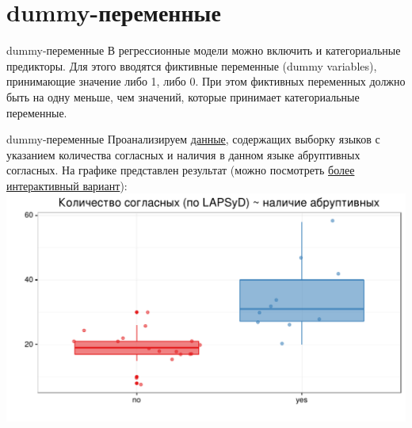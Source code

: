 \section{dummy-переменные}
\begin{frame}{dummy-переменные}
В регрессионные модели можно включить и категориальные предикторы. Для этого вводятся фиктивные переменные (dummy variables), принимающие значение либо 1, либо 0. При этом фиктивных переменных должно быть на одну меньше, чем значений, которые принимает категориальные переменные.
\end{frame}
\begin{frame}{dummy-переменные}
Проанализируем \href{http://goo.gl/0btfKa}{\alert{данные}}, содержащих выборку языков с указанием количества согласных и наличия в данном языке абруптивных согласных. На графике представлен результат (можно посмотреть \href{http://goo.gl/JgrU6g}{\alert{более интерактивный вариант}}):\\
\includegraphics[width=0.99\linewidth]{ejectives.pdf}
\end{frame}
